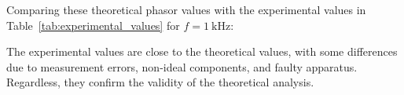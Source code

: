 \documentclass[12pt]{article}
\begin{document}
\begin{large}
	Comparing these theoretical phasor values with the experimental values in Table~\ref{tab:experimental_values} for $ f = \SI{1}{\kilo\hertz} $:

	\begin{table}[H]
		\caption{Comparison of Theoretical and Experimental Values at $ f = \SI{1}{\kilo\hertz} $}
		\label{tab:exp_theory_comparison}
	\end{table}

	The experimental values are close to the theoretical values, with some differences due to measurement errors, non-ideal components, and faulty apparatus. Regardless, they confirm the validity of the theoretical analysis.


\end{large}
\end{document}
